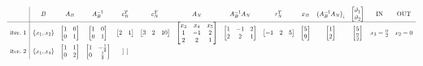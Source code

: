 \begin{equation*}
\scalemath{0.65}{
\begin{array}{ c|c c c c c c c c c c c c c }
 & B & A_{B} & A_{B}^{-1} & c_{B}^{T} & c_{N}^{T} & A_{N} & A_{B}^{-1} A_{N} & r_{N}^{T} & x_{B} & \left( A_{B}^{-1} A_{N}\right)_{i} & \begin{bmatrix}
\vartheta _{1}\\
\vartheta _{2}
\end{bmatrix} & \text{IN} & \text{OUT}\\
\hline
\text{iter.} \ 1 & \{x_{1} ,x_{2}\} & \begin{bmatrix}
1 & 0\\
0 & 1
\end{bmatrix} & \begin{bmatrix}
1 & 0\\
0 & 1
\end{bmatrix} & \begin{bmatrix}
2 & 1
\end{bmatrix} & \begin{bmatrix}
3 & 2 & 10
\end{bmatrix} & \begin{bmatrix}
x_{3} & x_{4} & x_{5}\\
1 & -1 & 2\\
2 & 2 & 1
\end{bmatrix} & \begin{bmatrix}
1 & -1 & 2\\
2 & 2 & 1
\end{bmatrix} & \begin{bmatrix}
-1 & 2 & 5
\end{bmatrix} & \begin{bmatrix}
5\\
9
\end{bmatrix} & \begin{bmatrix}
1\\
2
\end{bmatrix} & \begin{bmatrix}
5\\
\frac{9}{2}
\end{bmatrix} & x_{3} =\frac{9}{2} & x_{2} =0\\
\text{iter.} \ 2 & \{x_{1} ,x_{3}\} & \begin{bmatrix}
1 & 1\\
0 & 2
\end{bmatrix} & \begin{bmatrix}
1 & -\frac{1}{2}\\
0 & \frac{1}{2}
\end{bmatrix} & \begin{bmatrix}

\end{bmatrix}
\end{array}}
\end{equation*}
